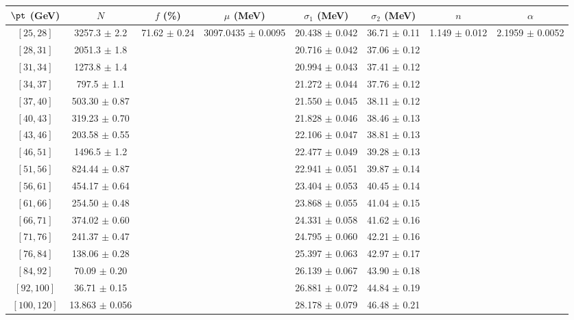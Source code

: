\begin{tabular}{c||c|c|c|c|c|c|c}
$\pt$ (GeV) & $N$ & $f$ (\%) & $\mu$ (MeV) & $\sigma_1$ (MeV) & $\sigma_2$ (MeV) & $n$ & $\alpha$ \\
\hline
$[25, 28]$ & 3257.3 $\pm$ 2.2 & \multirow{17}{*}{71.62 $\pm$ 0.24} & \multirow{17}{*}{3097.0435 $\pm$ 0.0095} & 20.438 $\pm$ 0.042 & 36.71 $\pm$ 0.11 & \multirow{17}{*}{1.149 $\pm$ 0.012} & \multirow{17}{*}{2.1959 $\pm$ 0.0052}\\
$[28, 31]$ & 2051.3 $\pm$ 1.8 &  &  & 20.716 $\pm$ 0.042 & 37.06 $\pm$ 0.12 &  & \\
$[31, 34]$ & 1273.8 $\pm$ 1.4 &  &  & 20.994 $\pm$ 0.043 & 37.41 $\pm$ 0.12 &  & \\
$[34, 37]$ & 797.5 $\pm$ 1.1 &  &  & 21.272 $\pm$ 0.044 & 37.76 $\pm$ 0.12 &  & \\
$[37, 40]$ & 503.30 $\pm$ 0.87 &  &  & 21.550 $\pm$ 0.045 & 38.11 $\pm$ 0.12 &  & \\
$[40, 43]$ & 319.23 $\pm$ 0.70 &  &  & 21.828 $\pm$ 0.046 & 38.46 $\pm$ 0.13 &  & \\
$[43, 46]$ & 203.58 $\pm$ 0.55 &  &  & 22.106 $\pm$ 0.047 & 38.81 $\pm$ 0.13 &  & \\
$[46, 51]$ & 1496.5 $\pm$ 1.2 &  &  & 22.477 $\pm$ 0.049 & 39.28 $\pm$ 0.13 &  & \\
$[51, 56]$ & 824.44 $\pm$ 0.87 &  &  & 22.941 $\pm$ 0.051 & 39.87 $\pm$ 0.14 &  & \\
$[56, 61]$ & 454.17 $\pm$ 0.64 &  &  & 23.404 $\pm$ 0.053 & 40.45 $\pm$ 0.14 &  & \\
$[61, 66]$ & 254.50 $\pm$ 0.48 &  &  & 23.868 $\pm$ 0.055 & 41.04 $\pm$ 0.15 &  & \\
$[66, 71]$ & 374.02 $\pm$ 0.60 &  &  & 24.331 $\pm$ 0.058 & 41.62 $\pm$ 0.16 &  & \\
$[71, 76]$ & 241.37 $\pm$ 0.47 &  &  & 24.795 $\pm$ 0.060 & 42.21 $\pm$ 0.16 &  & \\
$[76, 84]$ & 138.06 $\pm$ 0.28 &  &  & 25.397 $\pm$ 0.063 & 42.97 $\pm$ 0.17 &  & \\
$[84, 92]$ & 70.09 $\pm$ 0.20 &  &  & 26.139 $\pm$ 0.067 & 43.90 $\pm$ 0.18 &  & \\
$[92, 100]$ & 36.71 $\pm$ 0.15 &  &  & 26.881 $\pm$ 0.072 & 44.84 $\pm$ 0.19 &  & \\
$[100, 120]$ & 13.863 $\pm$ 0.056 &  &  & 28.178 $\pm$ 0.079 & 46.48 $\pm$ 0.21 &  & \\
\end{tabular}
